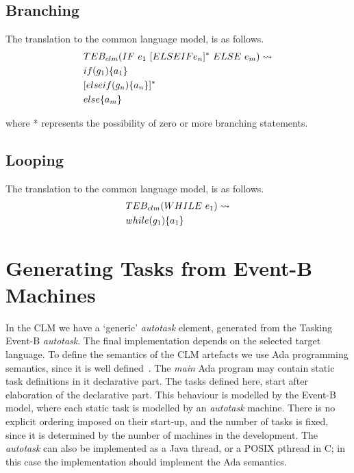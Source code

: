 \subsection{Branching}
The translation to the common language model, is as follows.
\begin{equation}
\begin{split}
&TEB_{clm}(IF~ e_1~[ELSEIF e_n]^*~ELSE~ e_m) \leadsto\\
& if(g_1)\{ a_1 \} \\
&[elseif(g_n)\{a_n\}]^*\\
& else\{a_m \}
\end{split}
\notag
\end{equation}

where * represents the possibility of zero or more branching statements.

\subsection{Looping}
The translation to the common language model, is as follows.
\begin{equation}
\begin{split}
&TEB_{clm}(WHILE~ e_1 ) \leadsto\\
& while(g_1)\{ a_1 \}
\end{split}
\notag
\end{equation}

\section{Generating Tasks from Event-B Machines}
%
In the CLM we have a `generic' \emph{autotask} element, generated from the Tasking Event-B \emph{autotask}. The final implementation depends on the selected target language. To define the semantics of the CLM artefacts we use Ada programming semantics, since it is well defined~\cite{ada2005}. The \emph{main} Ada program may contain static task definitions in it declarative part. The tasks defined here, start after elaboration of the declarative part. This behaviour is modelled by the Event-B model, where each static task is modelled by an \emph{autotask} machine. There is no explicit ordering imposed on their start-up, and  the number of tasks is fixed, since it is determined by the number of machines in the development. The \emph{autotask} can also be implemented as a Java thread, or a POSIX pthread in C; in this case the implementation should implement the Ada semantics.

